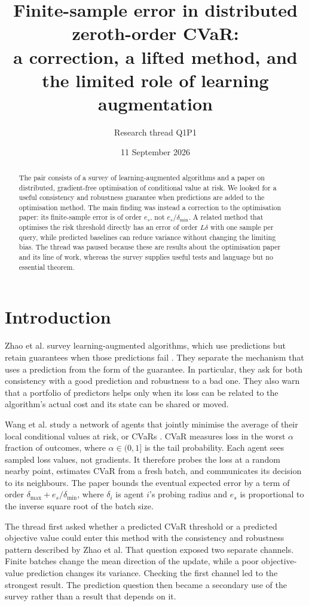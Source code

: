 \documentclass{article}
\title{Finite-sample error in distributed zeroth-order CVaR:\\
a correction, a lifted method, and the limited role of learning augmentation}
\author{Research thread Q1P1}
\date{11 September 2026}
\begin{document}
\maketitle

\begin{abstract}
The pair consists of a survey of learning-augmented algorithms and a paper on distributed, gradient-free optimisation of conditional value at risk. We looked for a useful consistency and robustness guarantee when predictions are added to the optimisation method. The main finding was instead a correction to the optimisation paper: its finite-sample error is of order $e_s$, not $e_s/\delta_{\min}$. A related method that optimises the risk threshold directly has an error of order $L\delta$ with one sample per query, while predicted baselines can reduce variance without changing the limiting bias. The thread was paused because these are results about the optimisation paper and its line of work, whereas the survey supplies useful tests and language but no essential theorem.
\end{abstract}

\section{Introduction}

Zhao et al. survey learning-augmented algorithms, which use predictions but retain guarantees when those predictions fail \cite{Q}. They separate the mechanism that uses a prediction from the form of the guarantee. In particular, they ask for both consistency with a good prediction and robustness to a bad one. They also warn that a portfolio of predictors helps only when its loss can be related to the algorithm's actual cost and its state can be shared or moved.

Wang et al. study a network of agents that jointly minimise the average of their local conditional values at risk, or CVaRs \cite{P}. CVaR measures loss in the worst $\alpha$ fraction of outcomes, where $\alpha\in(0,1]$ is the tail probability. Each agent sees sampled loss values, not gradients. It therefore probes the loss at a random nearby point, estimates CVaR from a fresh batch, and communicates its decision to its neighbours. The paper bounds the eventual expected error by a term of order $\delta_{\max}+e_s/\delta_{\min}$, where $\delta_i$ is agent $i$'s probing radius and $e_s$ is proportional to the inverse square root of the batch size.

The thread first asked whether a predicted CVaR threshold or a predicted objective value could enter this method with the consistency and robustness pattern described by Zhao et al. That question exposed two separate channels. Finite batches change the mean direction of the update, while a poor objective-value prediction changes its variance. Checking the first channel led to the strongest result. The prediction question then became a secondary use of the survey rather than a result that depends on it.
\end{document}
